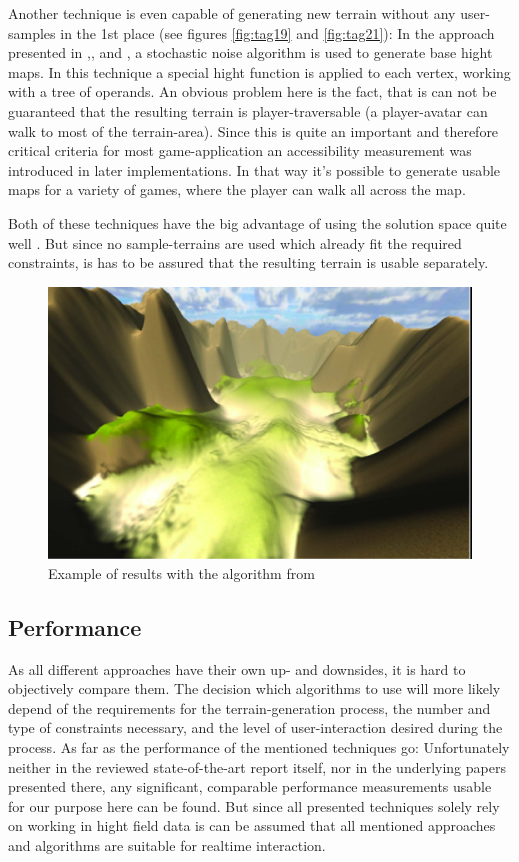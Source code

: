 Another technique is even capable of generating new terrain without any user-samples in the 1st place (see figures \ref{fig:tag19} and \ref{fig:tag21}): In the approach presented in \cite{frade2009breeding},\cite{frade2010evolution1},\cite{frade2010evolution2} and \cite{rodrigues2010development}, a stochastic noise algorithm is used to generate base hight maps. In this technique a special hight function is applied to each vertex, working with a tree of operands. An obvious problem here is the fact, that is can not be guaranteed that the resulting terrain is player-traversable (a player-avatar can walk to most of the terrain-area). Since this is quite an important and therefore critical criteria for most game-application an accessibility measurement was introduced in later implementations. In that way it's possible to generate usable maps for a variety of games, where the player can walk all across the map.

Both of these techniques have the big advantage of using the solution space quite well \cite{raffe2012survey}. But since no sample-terrains are used which already fit the required constraints, is has to be assured that the resulting terrain is usable separately.

\begin{figure}[htb]
	\centering
	\includegraphics[width=\linewidth]{RZL12/sjrjsrtr6zsr6z.jpg}
	\caption{Example of results with the algorithm from \cite{raffe2011evolving}}
	\label{fig:tag25}
\end{figure}

\subsection{Performance}
As all different approaches have their own up- and downsides, it is hard to objectively compare them. The decision which algorithms to use will more likely depend of the requirements for the terrain-generation process, the number and type of constraints necessary, and the level of user-interaction desired during the process. As far as the performance of the mentioned techniques go: Unfortunately neither in the reviewed state-of-the-art report itself, nor in the underlying papers presented there, any significant, comparable performance measurements usable for our purpose here can be found. But since all presented techniques solely rely on working in hight field data is can be assumed that all mentioned approaches and algorithms are suitable for realtime interaction.